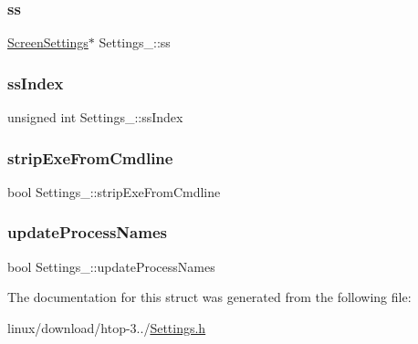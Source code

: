\mbox{\label{structSettings___a8c692092a7b56011a25207960937a57e}} 
\subsubsection{\texorpdfstring{ss}{ss}}
{\footnotesize\ttfamily \hyperlink{Settings_8h_a86d3dc963e563d775d50b8cc2b77afb8}{Screen\+Settings}$\ast$ Settings\+\_\+\+::ss}

\mbox{\label{structSettings___a73cb2d6902ec939990de193bac96efb7}} 
\subsubsection{\texorpdfstring{ss\+Index}{ssIndex}}
{\footnotesize\ttfamily unsigned int Settings\+\_\+\+::ss\+Index}

\mbox{\label{structSettings___acae26747ca38756e4016ebb30a2912d9}} 
\subsubsection{\texorpdfstring{strip\+Exe\+From\+Cmdline}{stripExeFromCmdline}}
{\footnotesize\ttfamily bool Settings\+\_\+\+::strip\+Exe\+From\+Cmdline}

\mbox{\label{structSettings___affd9d0293cbe17465533716ce1009884}} 
\subsubsection{\texorpdfstring{update\+Process\+Names}{updateProcessNames}}
{\footnotesize\ttfamily bool Settings\+\_\+\+::update\+Process\+Names}



The documentation for this struct was generated from the following file\+:\begin{DoxyCompactItemize}
\item 
linux/download/htop-\/3../\hyperlink{Settings_8h}{Settings.\+h}\end{DoxyCompactItemize}
